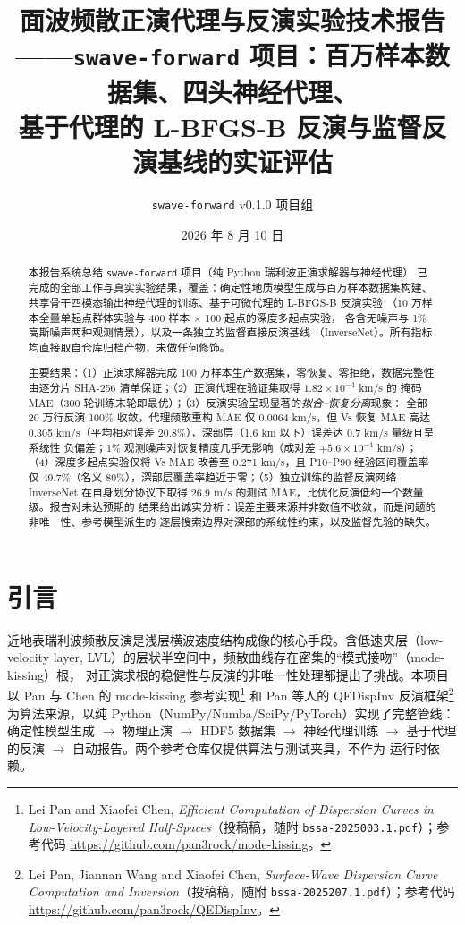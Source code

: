 \documentclass[UTF8,a4paper,11pt]{ctexart}
\title{\textbf{面波频散正演代理与反演实验技术报告}\\
\large ——\texttt{swave-forward} 项目：百万样本数据集、四头神经代理、\\
基于代理的 L-BFGS-B 反演与监督反演基线的实证评估}
\author{\texttt{swave-forward} v0.1.0 项目组}
\date{2026 年 8 月 10 日}
\begin{document}
\maketitle

\begin{abstract}
\noindent 本报告系统总结 \texttt{swave-forward} 项目（纯 Python 瑞利波正演求解器与神经代理）
已完成的全部工作与真实实验结果，覆盖：确定性地质模型生成与百万样本数据集构建、
共享骨干四模态输出神经代理的训练、基于可微代理的 L-BFGS-B 反演实验
（10 万样本全量单起点群体实验与 400 样本 \(\times\) 100 起点的深度多起点实验，
各含无噪声与 1\% 高斯噪声两种观测情景），以及一条独立的监督直接反演基线
（InverseNet）。所有指标均直接取自仓库归档产物，未做任何修饰。

主要结果：（1）正演求解器完成 100 万样本生产数据集，零恢复、零拒绝，数据完整性
由逐分片 SHA-256 清单保证；（2）正演代理在验证集取得 \(1.82\times10^{-4}\) km/s 的
掩码 MAE（300 轮训练末轮即最优）；（3）反演实验呈现显著的\emph{拟合--恢复分离}现象：
全部 20 万行反演 100\% 收敛，代理频散重构 MAE 仅 0.0064 km/s，但 Vs 恢复 MAE 高达
0.305 km/s（平均相对误差 20.8\%），深部层（1.6 km 以下）误差达 0.7 km/s 量级且呈系统性
负偏差；1\% 观测噪声对恢复精度几乎无影响（成对差 \(+5.6\times10^{-4}\) km/s）；
（4）深度多起点实验仅将 Vs MAE 改善至 0.271 km/s，且 P10--P90 经验区间覆盖率仅
49.7\%（名义 80\%），深部层覆盖率趋近于零；（5）独立训练的监督反演网络 InverseNet
在自身划分协议下取得 26.9 m/s 的测试 MAE，比优化反演低约一个数量级。报告对未达预期的
结果给出诚实分析：误差主要来源并非数值不收敛，而是问题的非唯一性、参考模型派生的
逐层搜索边界对深部的系统性约束，以及监督先验的缺失。
\end{abstract}

\tableofcontents
\newpage

\section{引言}
近地表瑞利波频散反演是浅层横波速度结构成像的核心手段。含低速夹层（low-velocity
layer, LVL）的层状半空间中，频散曲线存在密集的``模式接吻''（mode-kissing）根，
对正演求根的稳健性与反演的非唯一性处理都提出了挑战。本项目以 Pan 与 Chen 的
mode-kissing 参考实现\footnote{Lei Pan and Xiaofei Chen, \emph{Efficient Computation
of Dispersion Curves in Low-Velocity-Layered Half-Spaces}（投稿稿，随附
\texttt{bssa-2025003.1.pdf}）；参考代码 \url{https://github.com/pan3rock/mode-kissing}。}
和 Pan 等人的 QEDispInv 反演框架\footnote{Lei Pan, Jiannan Wang and Xiaofei Chen,
\emph{Surface-Wave Dispersion Curve Computation and Inversion}（投稿稿，随附
\texttt{bssa-2025207.1.pdf}）；参考代码 \url{https://github.com/pan3rock/QEDispInv}。}
为算法来源，以纯 Python（NumPy/Numba/SciPy/PyTorch）实现了完整管线：
确定性模型生成 \(\to\) 物理正演 \(\to\) HDF5 数据集 \(\to\) 神经代理训练
\(\to\) 基于代理的反演 \(\to\) 自动报告。两个参考仓库仅提供算法与测试夹具，不作为
运行时依赖。
\end{document}
